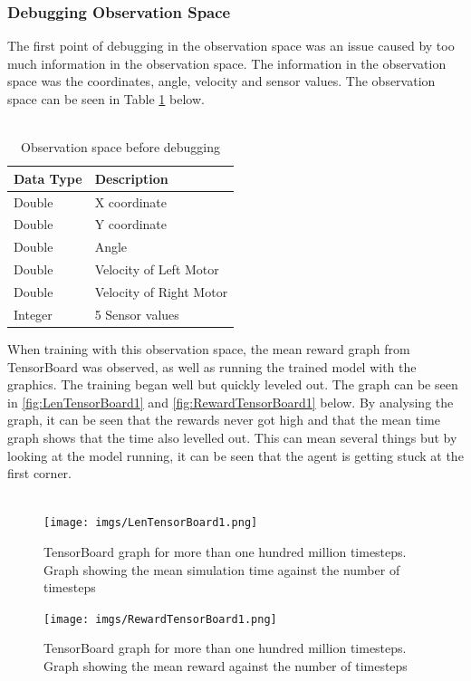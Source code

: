 \documentclass[a4paper,12pt]{article}
\begin{document}
\subsubsection{Debugging Observation Space}
The first point of debugging in the observation space was an issue caused by too much information in the observation space. The information in the observation space was the coordinates, angle, velocity and sensor values. The observation space can be seen in Table \ref{tab:Observation space before debugging} below.
\\\\
\begin{table}[H]
\label{table:ObsBeforeDebuggin}
\centering
\caption{Observation space before debugging}
\label{tab:Observation space before debugging}
\begin{tabular}{|ll|}
\hline
\textbf{Data Type} & \textbf{Description}\\ \hline
Double & X coordinate \\ 
Double & Y coordinate \\ 
Double & Angle\\ 
Double & Velocity of Left Motor \\ 
Double & Velocity of Right Motor \\ 
Integer & 5 Sensor values \\ \hline
\end{tabular}
\end{table}
\noindent
When training with this observation space, the mean reward graph from TensorBoard was observed, as well as running the trained model with the graphics. The training began well but quickly leveled out. The graph can be seen in \autoref{fig:LenTensorBoard1} and \autoref{fig:RewardTensorBoard1} below. By analysing the graph, it can be seen that the rewards never got high and that the mean time graph shows that the time also levelled out. This can mean several things but by looking at the model running, it can be seen that the agent is getting stuck at the first corner.
\\\\
\begin{figure}[H]
\centering
\texttt{[image: imgs/LenTensorBoard1.png]}
\caption{TensorBoard graph for more than one hundred million timesteps. Graph showing the mean simulation time against the number of timesteps}
\label{fig:LenTensorBoard1}
\end{figure}
\begin{figure}[H]
\centering
\texttt{[image: imgs/RewardTensorBoard1.png]}
\caption{TensorBoard graph for more than one hundred million timesteps. Graph showing the mean reward against the number of timesteps}
\label{fig:RewardTensorBoard1}
\end{figure}
\end{document}
